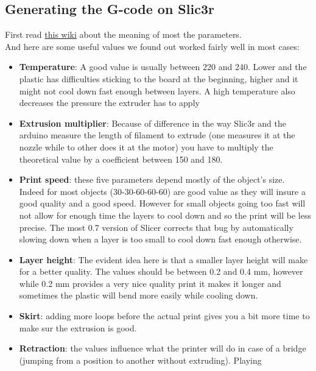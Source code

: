 \documentclass{article}
\begin{document}
\subsection{Generating the G-code on Slic3r}

First read \href{http://richrap.blogspot.com/2012/01/slic3r-is-nicer-part-1-settings-and.html}{this wiki} about the meaning of most the parameters. \\

And here are some useful values we found out worked fairly well in most cases:
\begin{itemize}
\item \textbf{Temperature}: A good value is usually between 220 and 240. Lower and the plastic has difficulties sticking to the board at the beginning, higher and it might not cool down fast enough between layers. A high temperature also decreases the pressure the extruder has to apply
\item \textbf{Extrusion multiplier}: Because of difference in the way Slic3r and the arduino measure the length of filament to extrude (one measures it at the nozzle while to other does it at the motor) you have to multiply the theoretical value by a coefficient between 150 and 180.
\item \textbf{Print speed}: these five parameters depend mostly of the object's size. Indeed for most objects (30-30-60-60-60) are good value as they will insure a good quality and a good speed. However for small objects going too fast will not allow for enough time the layers to cool down and so the print will be less precise. The most 0.7 version of Slicer corrects that bug by automatically slowing down when a layer is too small to cool down fast enough otherwise.
\item \textbf{Layer height}: The evident idea here is that a smaller layer height will make for a better quality. The values should be between 0.2 and 0.4 mm, however while 0.2 mm provides a very nice quality print it makes it longer and sometimes the plastic will bend more easily while cooling down.
\item \textbf{Skirt}: adding more loops before the actual print gives you a bit more time to make sur the extrusion is good.
\item \textbf{Retraction}: the values influence what the printer will do in case of a bridge (jumping from a position to another without extruding). Playing
\end{itemize}
\end{document}
